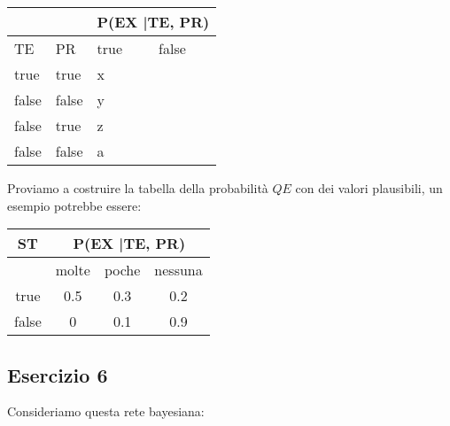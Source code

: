 \documentclass{article}
\begin{document}
\begin{tabular}{|ll|ll|}
	\hline
	\multicolumn{2}{|l|}{}              & \multicolumn{2}{l|}{P(EX |TE, PR)} \\ \hline
	\multicolumn{1}{|l|}{TE}    & PR    & \multicolumn{1}{l|}{true}  & false \\ \hline
	\multicolumn{1}{|l|}{true}  & true  & \multicolumn{1}{l|}{x}     &       \\ \hline
	\multicolumn{1}{|l|}{false} & false & \multicolumn{1}{l|}{y}     &       \\ \hline
	\multicolumn{1}{|l|}{false} & true  & \multicolumn{1}{l|}{z}     &       \\ \hline
	\multicolumn{1}{|l|}{false} & false & \multicolumn{1}{l|}{a}     &       \\ \hline
\end{tabular}

Proviamo a costruire la tabella della probabilità \(QE\) con dei valori plausibili, un esempio potrebbe essere:
\\

\begin{tabular}{|c|ccc|}
	\hline
	ST    & \multicolumn{3}{c|}{P(EX |TE, PR)}                                \\ \hline
	& \multicolumn{1}{c|}{molte} & \multicolumn{1}{c|}{poche} & nessuna \\ \hline
	true  & \multicolumn{1}{c|}{0.5}   & \multicolumn{1}{c|}{0.3}   & 0.2     \\ \hline
	false & \multicolumn{1}{c|}{0}     & \multicolumn{1}{c|}{0.1}   & 0.9     \\ \hline
\end{tabular}
  
 \pagebreak
 
 \subsection{Esercizio 6}
 Consideriamo questa rete bayesiana:
 \\
 \begin{center}
 \end{center}
\end{document}
